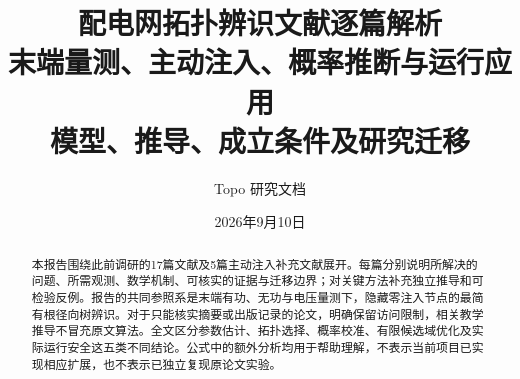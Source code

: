 \documentclass[UTF8,11pt,fontset=fandol]{ctexart}
\title{配电网拓扑辨识文献逐篇解析\\[0.5em]\large 末端量测、主动注入、概率推断与运行应用\\模型、推导、成立条件及研究迁移}
\author{Topo 研究文档}
\date{2026年9月10日}
\theoremstyle{remark}
\numberwithin{equation}{section}
\begin{document}
\maketitle
\begin{abstract}
本报告围绕此前调研的17篇文献及5篇主动注入补充文献展开。每篇分别说明所解决的问题、所需观测、数学机制、可核实的证据与迁移边界；对关键方法补充独立推导和可检验反例。报告的共同参照系是末端有功、无功与电压量测下，隐藏零注入节点的最简有根径向树辨识。对于只能核实摘要或出版记录的论文，明确保留访问限制，相关教学推导不冒充原文算法。全文区分参数估计、拓扑选择、概率校准、有限候选域优化及实际运行安全这五类不同结论。公式中的额外分析均用于帮助理解，不表示当前项目已实现相应扩展，也不表示已独立复现原论文实验。
\end{abstract}
\tableofcontents
\clearpage

\clearpage

\clearpage

\clearpage

\clearpage

\clearpage

\clearpage


\end{document}
